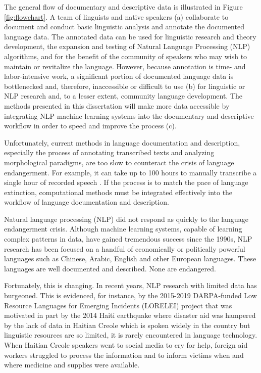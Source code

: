 The general flow of documentary and descriptive data is illustrated in Figure \ref{fig:flowchart}. A team of linguists and native speakers (a) collaborate to document and conduct basic linguistic analysis and annotate the documented language data. The annotated data can be used for linguistic research and theory development, the expansion and testing of Natural Language Processing (NLP) algorithms, and for the benefit of the community of speakers who may wish to maintain or revitalize the language. However, because annotation is time- and labor-intensive work, a significant portion of documented language data is bottlenecked and, therefore, inaccessible or difficult to use (b) for linguistic or NLP research and, to a lesser extent, community language development. The methods presented in this dissertation will make more data accessible by integrating NLP machine learning systems into the documentary and descriptive workflow in order to speed and improve the process (c).

Unfortunately, current methods in language documentation and description, especially the process of annotating transcribed texts and analyzing morphological paradigms, are too slow to counteract the crisis of language endangerment. For example, it can take up to 100 hours to manually transcribe a single hour of recorded speech \citep{seifart_language_2018}.
If the process is to match the pace of language extinction, computational methods must be integrated effectively into the workflow of language documentation and description. 

Natural language processing (NLP) did not respond as quickly to the language endangerment crisis. Although machine learning systems, capable of learning complex patterns in data, have gained tremendous success since the 1990s, NLP research has been focused on a handful of economically or politically powerful languages such as Chinese, Arabic, English and other European languages. These languages are well documented and described. None 
are endangered.

Fortunately, this is changing. In recent years, NLP research with limited data has burgeoned. This is evidenced, for instance, by the 2015-2019 DARPA-funded Low Resource Languages for Emerging Incidents (LORELEI) project that was motivated in part by the 2014 Haiti earthquake where disaster aid was hampered by the lack of data in Haitian Creole which is spoken widely in the country but linguistic resources are so limited, it is rarely encountered in language technology. When Haitian Creole speakers went to social media to cry for help, foreign aid workers struggled to process the information and to inform victims when and where medicine and supplies were available.


